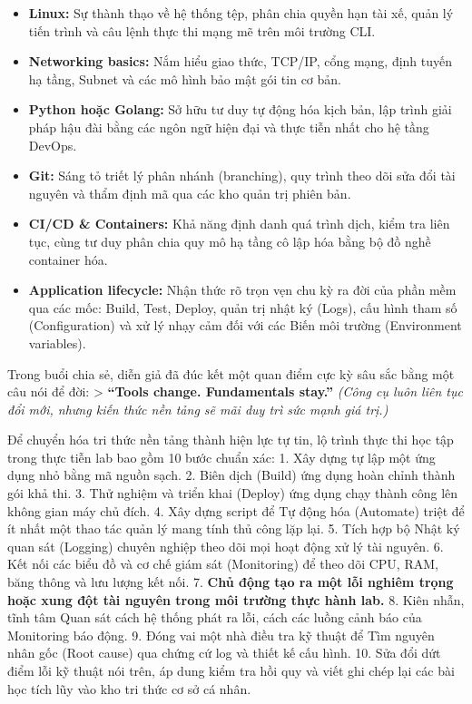 \begin{itemize}
\tightlist
\item
  \textbf{Linux:} Sự thành thạo về hệ thống tệp, phân chia quyền hạn tài
  xế, quản lý tiến trình và câu lệnh thực thi mạng mẽ trên môi trường
  CLI.
\item
  \textbf{Networking basics:} Nắm hiểu giao thức, TCP/IP, cổng mạng,
  định tuyến hạ tầng, Subnet và các mô hình bảo mật gói tin cơ bản.
\item
  \textbf{Python hoặc Golang:} Sở hữu tư duy tự động hóa kịch bản, lập
  trình giải pháp hậu đài bằng các ngôn ngữ hiện đại và thực tiễn nhất
  cho hệ tầng DevOps.
\item
  \textbf{Git:} Sáng tỏ triết lý phân nhánh (branching), quy trình theo
  dõi sửa đổi tài nguyên và thẩm định mã qua các kho quản trị phiên bản.
\item
  \textbf{CI/CD \& Containers:} Khả năng định danh quá trình dịch, kiểm
  tra liên tục, cùng tư duy phân chia quy mô hạ tầng cô lập hóa bằng bộ
  đồ nghề container hóa.
\item
  \textbf{Application lifecycle:} Nhận thức rõ trọn vẹn chu kỳ ra đời
  của phần mềm qua các mốc: Build, Test, Deploy, quản trị nhật ký
  (Logs), cấu hình tham số (Configuration) và xử lý nhạy cảm đối với các
  Biến môi trường (Environment variables).
\end{itemize}

Trong buổi chia sẻ, diễn giả đã đúc kết một quan điểm cực kỳ sâu sắc
bằng một câu nói để đời: \textgreater{} \textbf{``Tools change.
Fundamentals stay.''} \emph{(Công cụ luôn liên tục đổi mới, nhưng kiến
thức nền tảng sẽ mãi duy trì sức mạnh giá trị.)}

Để chuyển hóa tri thức nền tảng thành hiện lực tự tin, lộ trình thực thi
học tập trong thực tiễn lab bao gồm 10 bước chuẩn xác: 1. Xây dựng tự
lập một ứng dụng nhỏ bằng mã nguồn sạch. 2. Biên dịch (Build) ứng dụng
hoàn chỉnh thành gói khả thi. 3. Thử nghiệm và triển khai (Deploy) ứng
dụng chạy thành công lên không gian máy chủ đích. 4. Xây dựng script để
Tự động hóa (Automate) triệt để ít nhất một thao tác quản lý mang tính
thủ công lặp lại. 5. Tích hợp bộ Nhật ký quan sát (Logging) chuyên
nghiệp theo dõi mọi hoạt động xử lý tài nguyên. 6. Kết nối các biểu đồ
và cơ chế giám sát (Monitoring) để theo dõi CPU, RAM, băng thông và lưu
lượng kết nối. 7. \textbf{Chủ động tạo ra một lỗi nghiêm trọng hoặc xung
đột tài nguyên trong môi trường thực hành lab.} 8. Kiên nhẫn, tĩnh tâm
Quan sát cách hệ thống phát ra lỗi, cách các luồng cảnh báo của
Monitoring báo động. 9. Đóng vai một nhà điều tra kỹ thuật để Tìm nguyên
nhân gốc (Root cause) qua chứng cứ log và thiết kế cấu hình. 10. Sửa đổi
dứt điểm lỗi kỹ thuật nói trên, áp dung kiểm tra hồi quy và viết ghi
chép lại các bài học tích lũy vào kho tri thức cơ sở cá nhân.

